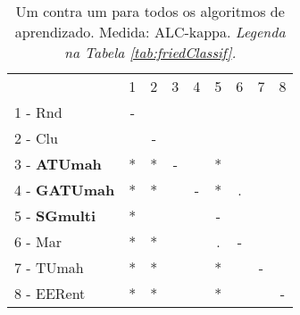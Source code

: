 \begin{table}[h]
\caption{Um contra um para todos os algoritmos de aprendizado. Medida: ALC-kappa. \textit{Legenda na Tabela \ref{tab:friedClassif}.}}
\begin{center}\begin{tabular}{lcc|cc|cc|cc}
 			& 1 & 2 & 3 & 4 & 5 & 6 & 7 & 8\\
1 - Rnd  	& - &   &   &   &   &   &   &   \\
2 - Clu  	&   & - &   &   &   &   &   &   \\ \hline
3 - \textbf{ATUmah}	& * & * & - &   & * &   &   &   \\
4 - \textbf{GATUmah}	& * & * &   & - & * & . &   &   \\ \hline
5 - \textbf{SGmulti}	& * &   &   &   & - &   &   &   \\
6 - Mar  	& * & * &   &   & . & - &   &   \\ \hline
7 - TUmah	& * & * &   &   & * &   & - &   \\
8 - EERent	& * & * &   &   & * &   &   & - \\ \hline\end{tabular}
\label{stratsALCKappaFriedAllReduxall}
\end{center}
\end{table}